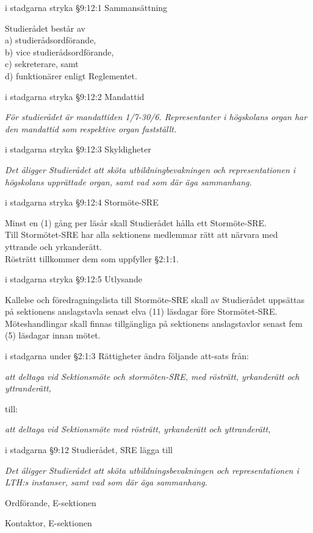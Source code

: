 \documentclass[10pt]{article}
\begin{document}
    \begin{attsatser}
      \att i stadgarna stryka \S9:12:1 Sammansättning\par
      \begin{itshape}
        Studierådet består av\\
        a) studierådsordförande,\\
        b) vice studierådsordförande,\\
        c) sekreterare, samt\\
        d) funktionärer enligt Reglementet.
      \end{itshape}

      \att i stadgarna stryka \S9:12:2 Mandattid\par
      \emph{För studierådet är mandattiden 1/7-30/6. Representanter i högskolans organ har den mandattid som respektive organ fastställt.}

      \att i stadgarna stryka \S9:12:3 Skyldigheter\par
      \emph{Det åligger Studierådet att sköta utbildningbevakningen och representationen i högskolans upprättade organ, samt vad som där äga sammanhang.}

      \att i stadgarna stryka \S9:12:4 Stormöte-SRE\par
      \begin{itshape}
        Minst en (1) gång per läsår skall Studierådet hålla ett Stormöte-SRE.\\
        Till Stormötet-SRE har alla sektionens medlemmar rätt att närvara med yttrande och yrkanderätt.\\
        Rösträtt tillkommer dem som uppfyller \S2:1:1.
      \end{itshape}

      \att i stadgarna stryka \S9:12:5 Utlysande\par
      \begin{itshape}
        Kallelse och föredragningslista till Stormöte-SRE skall av Studierådet uppsättas på sektionens anslagstavla senast elva (11) läsdagar före Stormötet-SRE.\\
        Möteshandlingar skall finnas tillgängliga på sektionens anslagstavlor senast fem (5) läsdagar innan mötet.
      \end{itshape}

      \att i stadgarna under \S2:1:3 Rättigheter ändra följande att-sats från:\par
      \emph{att deltaga vid Sektionsmöte och stormöten-SRE, med rösträtt, yrkanderätt och yttranderätt,}\par
      till:\par
      \emph{att deltaga vid Sektionsmöte med rösträtt, yrkanderätt och yttranderätt,}

      \att i stadgarna \S9:12 Studierådet, SRE lägga till\par
      \emph{Det åligger Studierådet att sköta utbildningsbevakningen och representationen i LTH:s instanser, samt vad som där äga sammanhang.}
    \end{attsatser}

    \begin{signatures}{2}
        \signature{Fredrik Peterson}{Ordförande, E-sektionen}
        \signature{Erik Månsson}{Kontaktor, E-sektionen}
    \end{signatures}
\end{document}
